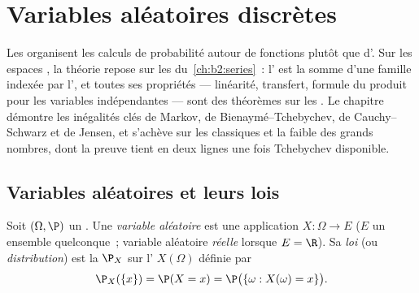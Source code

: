 \chapter{Variables aléatoires discrètes}\label{ch:b2:randomvar}

Les  organisent les calculs de probabilité
autour de fonctions plutôt que d'. Sur les espaces
, la théorie repose sur les 
du~\cref{ch:b2:series}~: l' est la somme d'une famille
indexée par l', et toutes ses propriétés --- linéarité,
transfert, formule du produit pour les variables indépendantes ---
sont des théorèmes sur les . Le chapitre démontre
les inégalités clés de Markov, de Bienaymé--Tchebychev, de
Cauchy--Schwarz et de Jensen, et s'achève sur les  classiques et
la  faible des grands nombres, dont la preuve tient en deux lignes
une fois Tchebychev disponible.

\section{Variables aléatoires et leurs lois}

\begin{definition}\label{def:b2:randomvar:law}
Soit $(\Omega, \P)$ un  . Une
\emph{variable aléatoire} est une application $X \colon \Omega \to E$ ($E$ un ensemble
quelconque~; variable aléatoire \emph{réelle} lorsque $E = \R$). Sa \emph{loi}
(ou \emph{distribution}) est la  $\P_X$ sur l' $X(\Omega)$ définie par
\[
\P_X(\{x\}) = \P(X = x)
= \P\bigl(\{\omega : X(\omega) = x\}\bigr) .
\]
\end{definition}

